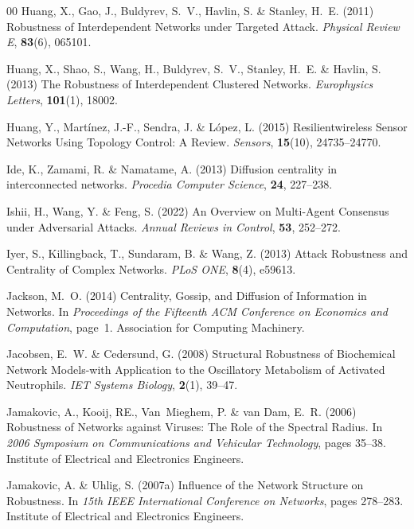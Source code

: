 \documentclass{comnet-mod}
\begin{document}
\begin{thebibliography}{00}
Huang, X., Gao, J., Buldyrev, S.~V., Havlin, S. {\&} Stanley, H.~E. (2011)
  {Robustness of Interdependent Networks under Targeted Attack}. {\em {Physical
  Review E}}, \textbf{83}(6), 065101.

Huang, X., Shao, S., Wang, H., Buldyrev, S.~V., Stanley, H.~E. {\&} Havlin, S.
  (2013)  {The Robustness of Interdependent Clustered Networks}. {\em
  {Europhysics Letters}}, \textbf{101}(1), 18002.

Huang, Y., Mart{\'i}nez, J.-F., Sendra, J. {\&} L{\'o}pez, L. (2015)
  {Resilientwireless Sensor Networks Using Topology Control: {{A}} Review}.
  {\em {Sensors}}, \textbf{15}(10), 24735--24770.

Ide, K., Zamami, R. {\&} Namatame, A. (2013)  Diffusion centrality in
  interconnected networks. {\em {Procedia Computer Science}}, \textbf{24},
  227--238.

Ishii, H., Wang, Y. {\&} Feng, S. (2022)  {An Overview on Multi-Agent Consensus
  under Adversarial Attacks}. {\em {Annual Reviews in Control}}, \textbf{53},
  252--272.

Iyer, S., Killingback, T., Sundaram, B. {\&} Wang, Z. (2013)  {Attack
  Robustness and Centrality of Complex Networks}. {\em {PLoS ONE}},
  \textbf{8}(4), e59613.

Jackson, M.~O. (2014)  {Centrality, Gossip, and Diffusion of Information in
  Networks}. In {\em {Proceedings of the Fifteenth {{ACM}} Conference on
  {{Economics}} and Computation}}, page~1. {Association for Computing
  Machinery}.

Jacobsen, E.~W. {\&} Cedersund, G. (2008)  {Structural Robustness of
  Biochemical Network Models-with Application to the Oscillatory Metabolism of
  Activated Neutrophils}. {\em {IET Systems Biology}}, \textbf{2}(1), 39--47.

Jamakovic, A., Kooij, {\relax RE}., Van~Mieghem, P. {\&} {van Dam}, E.~R.
  (2006)  {Robustness of Networks against Viruses: {{The}} Role of the Spectral
  Radius}. In {\em {2006 Symposium on Communications and Vehicular
  Technology}}, pages 35--38. {Institute of Electrical and Electronics
  Engineers}.

Jamakovic, A. {\&} Uhlig, S. (2007a)  {Influence of the Network Structure on
  Robustness}. In {\em {15th {{IEEE}} International Conference on Networks}},
  pages 278--283. {Institute of Electrical and Electronics Engineers}.


\end{thebibliography}
\end{document}
